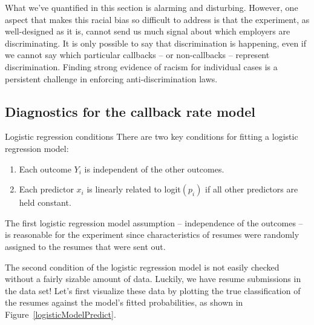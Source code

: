 What we've quantified in this section is alarming and disturbing.
However, one aspect that makes this racial bias so difficult to
address is that the experiment, as well-designed as it is,
cannot send us much signal about which employers are
discriminating.
It is only possible to say that discrimination is happening,
even if we cannot say which particular callbacks
-- or non-callbacks -- represent discrimination.
Finding strong evidence of racism for individual cases is
a persistent challenge in enforcing anti-discrimination laws.



\subsection{Diagnostics for the callback rate model}
\label{logistic_regr_diagnostics_subsection}

\begin{onebox}{Logistic regression conditions}
There are two key conditions for fitting a logistic regression model:\vspace{-1mm}
\begin{enumerate}
\setlength{\itemsep}{0mm}
\item
    Each outcome $Y_i$ is independent of the other outcomes.
\item
    Each predictor $x_i$ is linearly related to logit$(p_i)$
    if all other predictors are held constant.
\end{enumerate}
\end{onebox}

The first logistic regression model assumption
-- independence of the outcomes --
is reasonable for the experiment since characteristics
of resumes were randomly assigned to the resumes that
were sent out.

The second condition of the logistic regression model is
not easily checked without a fairly sizable amount of data.
Luckily, we have \resN{} resume submissions in the data set!
Let's first visualize these data by plotting the true
classification of the resumes against the model's fitted
probabilities, as shown in
Figure~\ref{logisticModelPredict}.

